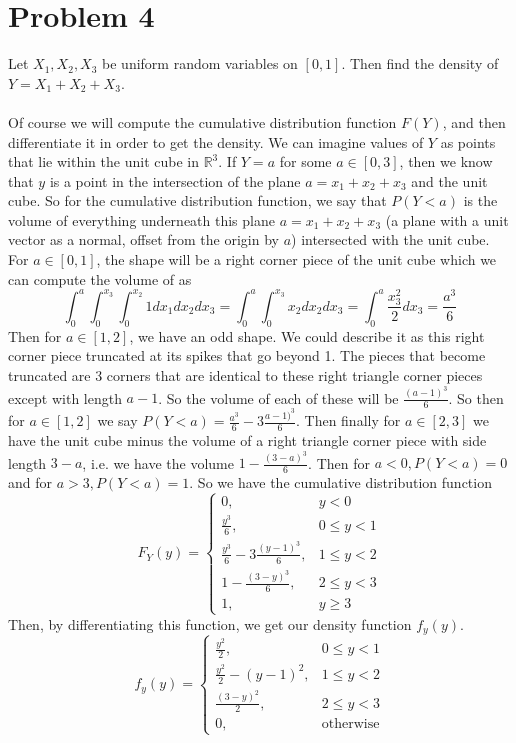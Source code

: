 \documentclass{article}
\begin{document}
\section*{Problem 4}
    Let $X_1, X_2, X_3$ be uniform random variables on $[0,1]$. Then find the density of $Y = X_1 + X_2 + X_3$.\\\\
    Of course we will compute the cumulative distribution function $F(Y)$, and then differentiate it in order to get the density.
    We can imagine values of $Y$ as points that lie within the unit cube in $\mathbb{R}^3$. If $Y = a$ for some $a \in [0,3]$, then 
    we know that $y$ is a point in the intersection of the plane $a = x_1 + x_2 + x_3$ and the unit cube. So for the cumulative distribution
    function, we say that $P(Y < a)$ is the volume of everything underneath this plane $a = x_1 + x_2 + x_3$ (a plane with a unit vector
    as a normal, offset from the origin by $a$) intersected with the unit cube. For $a \in [0,1]$, the shape will be a right corner piece of
    the unit cube which we can compute the volume of as
    \[
        \int_0^a \int_0^{x_3} \int_0^{x_2} 1 dx_1 dx_2 dx_3 = \int_0^a \int_0^{x_3} x_2 dx_2 dx_3 = \int_0^a \frac{x_3^2}{2} dx_3 = \frac{a^3}{6}
    \]
    Then for $a \in [1,2]$, we have an odd shape. We could describe it as this right corner piece truncated at its spikes that go beyond 1. The 
    pieces that become truncated are 3 corners that are identical to these right triangle corner pieces except with length $a - 1$. So the volume of 
    each of these will be $\frac{(a - 1)^3}{6}$. So then for $a \in [1,2]$ we say $P(Y < a) = \frac{a^3}{6} - 3 \frac{a - 1)^3}{6}$. Then finally for
    $a \in [2,3]$ we have the unit cube minus the volume of a right triangle corner piece with side length $3 - a$, i.e. we have the volume $1 - \frac{(3-a)^3}{6}$.
    Then for $a < 0, P(Y < a) = 0$ and for $a > 3, P(Y < a) = 1$. So we have the cumulative distribution function 
    \[
        F_Y(y) = \begin{cases}
            0, & y < 0 \\
            \frac{y^3}{6}, & 0 \leqslant y < 1 \\
            \frac{y^3}{6} - 3 \frac{(y - 1)^3}{6}, & 1 \leqslant y < 2 \\
            1 - \frac{(3 - y)^3}{6}, & 2 \leqslant y < 3 \\
            1, & y \geqslant 3
        \end{cases}
    \]
    Then, by differentiating this function, we get our density function $f_y(y)$.
    \[
        f_y(y) = \begin{cases}
            \frac{y^2}{2}, & 0 \leqslant y < 1 \\
            \frac{y^2}{2} - (y-1)^2, & 1 \leqslant y < 2 \\
            \frac{(3-y)^2}{2}, & 2 \leqslant y < 3 \\
            0, & \text{otherwise}
        \end{cases}
    \]
\end{document}
